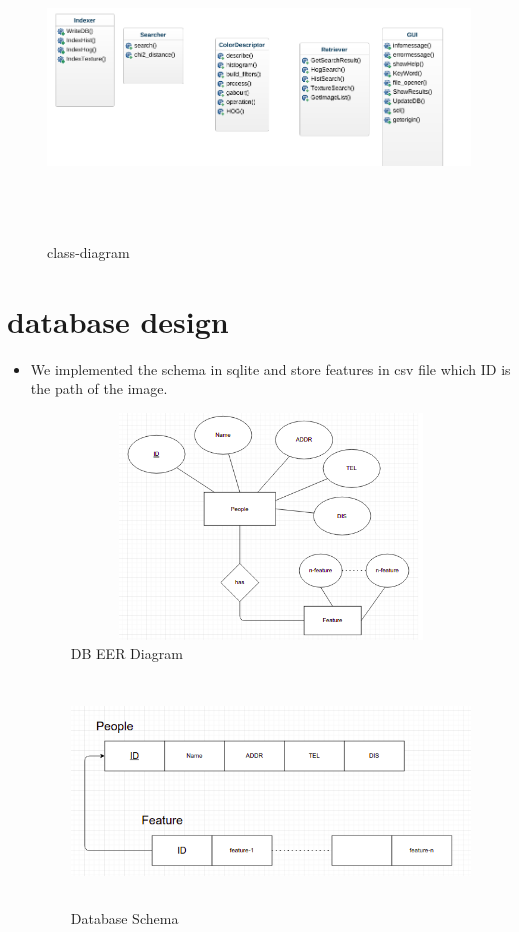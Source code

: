 \documentclass[pdftex,10pt,a4paper,oneside]{article}
\begin{document}
\begin{figure}[H]
	\centering
	\includegraphics[width=140mm,height=80mm]{fig/23.png}
	\caption{class-diagram }
	\label{class-diagram}
\end{figure}

\pagebreak
	\section{database design}
	\begin{itemize}
		\item We implemented the schema in sqlite and store features in csv file which ID is the path of the image.
			\begin{figure}[H]
			\centering
			\includegraphics[width=120mm,height=60mm]{fig/25.png}
			\caption{DB EER Diagram }
			\label{DB EER Diagram }
		\end{figure}
	\begin{figure}[H]
		\centering
		\includegraphics[width=120mm,height=60mm]{fig/24.png}
		\caption{Database Schema   }
		\label{Database Schema }
	\end{figure}
	\end{itemize}
\end{document}
